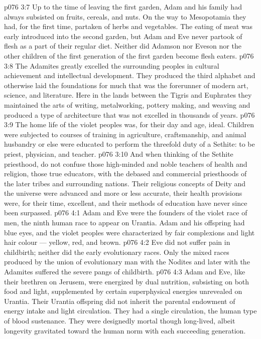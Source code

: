 \vs p076 3:7 Up to the time of leaving the first garden, Adam and his family had always subsisted on fruits, cereals, and nuts. On the way to Mesopotamia they had, for the first time, partaken of herbs and vegetables. The eating of meat was early introduced into the second garden, but Adam and Eve never partook of flesh as a part of their regular diet. Neither did Adamson nor Eveson nor the other children of the first generation of the first garden become flesh eaters.
\vs p076 3:8 \pc The Adamites greatly excelled the surrounding peoples in cultural achievement and intellectual development. They produced the third alphabet and otherwise laid the foundations for much that was the forerunner of modern art, science, and literature. Here in the lands between the Tigris and Euphrates they maintained the arts of writing, metalworking, pottery making, and weaving and produced a type of architecture that was not excelled in thousands of years.
\vs p076 3:9 The home life of the violet peoples was, for their day and age, ideal. Children were subjected to courses of training in agriculture, craftsmanship, and animal husbandry or else were educated to perform the threefold duty of a Sethite: to be priest, physician, and teacher.
\vs p076 3:10 And when thinking of the Sethite priesthood, do not confuse those high\hyp{}minded and noble teachers of health and religion, those true educators, with the debased and commercial priesthoods of the later tribes and surrounding nations. Their religious concepts of Deity and the universe were advanced and more or less accurate, their health provisions were, for their time, excellent, and their methods of education have never since been surpassed.
\vs p076 4:1 Adam and Eve were the founders of the violet race of men, the ninth human race to appear on Urantia. Adam and his offspring had blue eyes, and the violet peoples were characterized by fair complexions and light hair colour --- yellow, red, and brown.
\vs p076 4:2 Eve did not suffer pain in childbirth; neither did the early evolutionary races. Only the mixed races produced by the union of evolutionary man with the Nodites and later with the Adamites suffered the severe pangs of childbirth.
\vs p076 4:3 Adam and Eve, like their brethren on Jerusem, were energized by dual nutrition, subsisting on both food and light, supplemented by certain superphysical energies unrevealed on Urantia. Their Urantia offspring did not inherit the parental endowment of energy intake and light circulation. They had a single circulation, the human type of blood sustenance. They were designedly mortal though long\hyp{}lived, albeit longevity gravitated toward the human norm with each succeeding generation.
